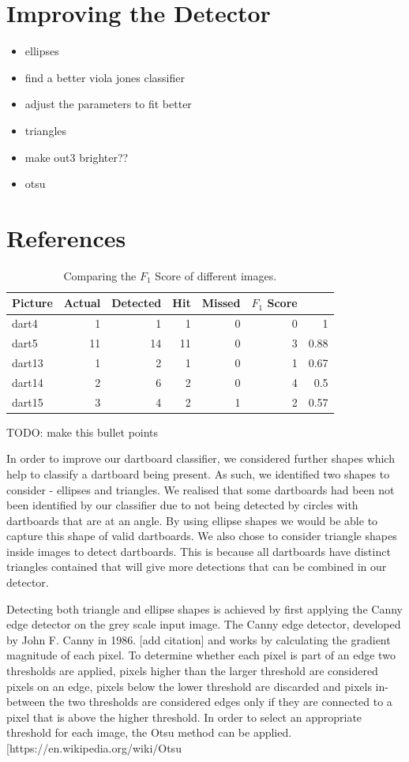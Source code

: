 \documentclass[a4paper]{article}
\begin{document}
\section*{Improving the Detector}
\begin{itemize}
	\item ellipses
	\item find a better viola jones classifier
	\item adjust the parameters to fit better
	\item triangles
    \item make out3 brighter??
    \item otsu
\end{itemize}

\section*{References}


\begin{table} [H]
\centering
\begin{tabular}{l| r | r | r | r | r | r}
Picture & Actual & Detected & Hit & Missed & \(F_{1}\) Score \\\hline
dart4 & 1 & 1 & 1 & 0 & 0 & 1\\
dart5 & 11 & 14 & 11 & 0 & 3 & 0.88 \\
dart13 & 1 & 2 & 1 & 0 & 1 & 0.67 \\
dart14 & 2 & 6 & 2 & 0 & 4 & 0.5 \\
dart15 & 3 & 4 & 2 & 1 & 2 & 0.57
\end{tabular}
\caption{\label{tab:F1}Comparing the \(F_{1}\) Score of different images.}
\end{table}

TODO: make this bullet points

In order to improve our dartboard classifier, we considered further shapes
which help to classify a dartboard being present.  As such, we identified two
shapes to consider - ellipses and triangles.  We realised that some dartboards
had been not been identified by our classifier due to not being detected by
circles with dartboards that are at an angle.  By using ellipse shapes we would
be able to capture this shape of valid dartboards.  We also chose to consider
triangle shapes inside images to detect dartboards.  This is because all
dartboards have distinct triangles contained that will give more detections
that can be combined in our detector.

Detecting both triangle and ellipse shapes is achieved by first applying the
Canny edge detector on the grey scale input image.  The Canny edge detector,
developed by  John F. Canny in 1986. [add citation] and works by calculating
the gradient magnitude of each pixel. To determine whether each pixel is part
of an edge two thresholds are applied, pixels higher than the larger threshold
are considered pixels on an edge, pixels below the lower threshold are
discarded and pixels in-between the two thresholds are considered edges only if
they are connected to a pixel that is above the higher threshold.  In order to
select an appropriate threshold for each image, the Otsu method can be applied.
[https://en.wikipedia.org/wiki/Otsu%
\end{document}
